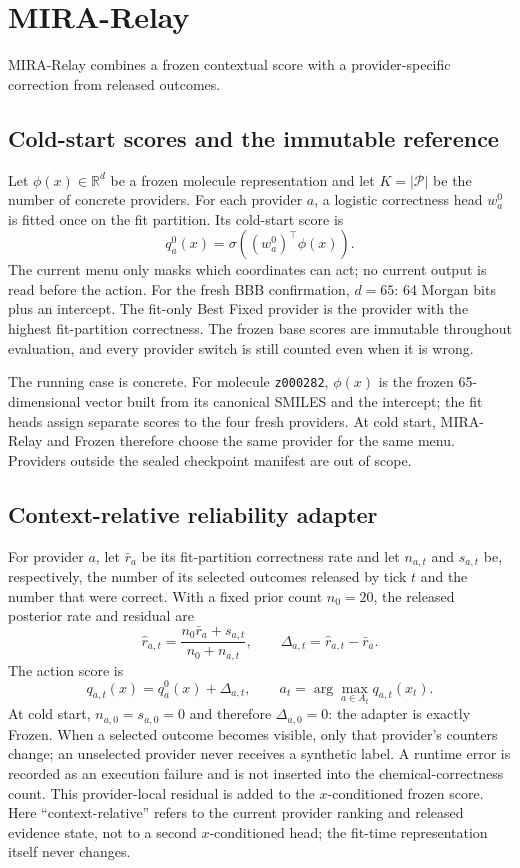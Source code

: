 \documentclass[sigconf,anonymous]{aamas}
\begin{document}
\section{MIRA-Relay}
MIRA-Relay combines a frozen contextual score with a provider-specific correction from released outcomes.

\subsection{Cold-start scores and the immutable reference}
Let $\phi(x)\in\mathbb{R}^{d}$ be a frozen molecule representation and let $K=|\mathcal P|$ be the number of concrete providers. For each provider $a$, a logistic correctness head $w_a^0$ is fitted once on the fit partition. Its cold-start score is
$$
q_a^0(x)=\sigma\!\left((w_a^0)^\top\phi(x)\right).
$$
The current menu only masks which coordinates can act; no current output is read before the action. For the fresh BBB confirmation, $d=65$: 64 Morgan bits plus an intercept. The fit-only Best Fixed provider is the provider with the highest fit-partition correctness. The frozen base scores are immutable throughout evaluation, and every provider switch is still counted even when it is wrong.

The running case is concrete. For molecule \texttt{z000282}, $\phi(x)$ is the frozen 65-dimensional vector built from its canonical SMILES and the intercept; the fit heads assign separate scores to the four fresh providers. At cold start, MIRA-Relay and Frozen therefore choose the same provider for the same menu. Providers outside the sealed checkpoint manifest are out of scope.

\subsection{Context-relative reliability adapter}
For provider $a$, let $\bar r_a$ be its fit-partition correctness rate and let $n_{a,t}$ and $s_{a,t}$ be, respectively, the number of its selected outcomes released by tick $t$ and the number that were correct. With a fixed prior count $n_0=20$, the released posterior rate and residual are
$$
\widehat r_{a,t}=\frac{n_0\bar r_a+s_{a,t}}{n_0+n_{a,t}},\qquad
\Delta_{a,t}=\widehat r_{a,t}-\bar r_a.
$$
The action score is
$$
q_{a,t}(x)=q_a^0(x)+\Delta_{a,t},
\qquad
 a_t=\arg\max_{a\in A_t}q_{a,t}(x_t).
$$
At cold start, $n_{a,0}=s_{a,0}=0$ and therefore $\Delta_{a,0}=0$: the adapter is exactly Frozen. When a selected outcome becomes visible, only that provider's counters change; an unselected provider never receives a synthetic label. A runtime error is recorded as an execution failure and is not inserted into the chemical-correctness count. This provider-local residual is added to the $x$-conditioned frozen score. Here ``context-relative'' refers to the current provider ranking and released evidence state, not to a second $x$-conditioned head; the fit-time representation itself never changes.
\end{document}
